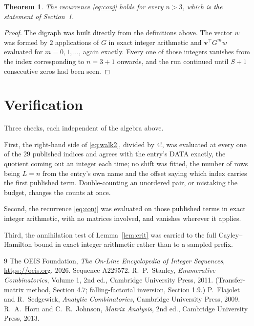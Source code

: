 \documentclass[11pt,a4paper]{article}
\theoremstyle{plain}
\newtheorem{theorem}{Theorem}
\theoremstyle{definition}
\begin{document}
\begin{theorem}
The recurrence \eqref{eq:conj} holds for every $n>3$, which is the statement of
Section~1.
\end{theorem}

\begin{proof}
The digraph was built directly from the definitions above. The vector $w$ was formed by
$2$ applications of $G$ in exact integer arithmetic and $\mathbf{v}^{\!\top}G^{m}w$
evaluated for $m=0,1,\dots$, again exactly. Every one of those integers vanishes from the
index corresponding to $n=3+1$ onwards, and the run continued until $S+1$ consecutive
zeros had been seen.
\end{proof}

\section{Verification}

Three checks, each independent of the algebra above.

First, the right-hand side of \eqref{eq:walk2}, divided by $4!$, was evaluated at every
one of the $29$ published indices and agrees with the entry's DATA exactly, the quotient
coming out an integer each time; no shift was fitted, the number of rows being $L=n$
from the entry's own name and the offset saying which index carries the first published term.
Double-counting an unordered pair, or mistaking the budget, changes the counts at once.

Second, the recurrence \eqref{eq:conj} was evaluated on those published terms in exact
integer arithmetic, with no matrices involved, and vanishes wherever it applies.

Third, the annihilation test of Lemma~\ref{lem:crit} was carried to the full
Cayley--Hamilton bound in exact integer arithmetic rather than to a sampled prefix.

\begin{thebibliography}{9}
 The OEIS Foundation, \emph{The On-Line Encyclopedia of Integer
Sequences}, \url{https://oeis.org}, 2026. Sequence A229572.
 R.~P.~Stanley, \emph{Enumerative Combinatorics}, Volume 1, 2nd ed.,
Cambridge University Press, 2011. (Transfer-matrix method, Section 4.7; falling-factorial
inversion, Section 1.9.)
 P.~Flajolet and R.~Sedgewick, \emph{Analytic Combinatorics}, Cambridge
University Press, 2009.
 R.~A.~Horn and C.~R.~Johnson, \emph{Matrix Analysis}, 2nd ed., Cambridge
University Press, 2013.
\end{thebibliography}
\end{document}
